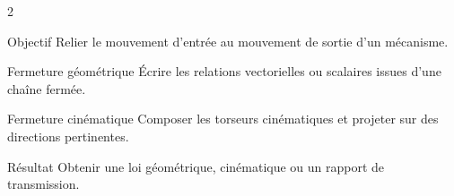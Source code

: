\documentclass[a3paper,landscape,10pt]{article}
\begin{document}
\begin{multicols}{2}
\begin{TLPosterBloc}{Objectif}
Relier le mouvement d'entrée au mouvement de sortie d'un mécanisme.
\end{TLPosterBloc}

\begin{TLPosterBloc}{Fermeture géométrique}
Écrire les relations vectorielles ou scalaires issues d'une chaîne fermée.
\end{TLPosterBloc}

\begin{TLPosterBloc}{Fermeture cinématique}
Composer les torseurs cinématiques et projeter sur des directions pertinentes.
\end{TLPosterBloc}

\begin{TLPosterBloc}{Résultat}
Obtenir une loi géométrique, cinématique ou un rapport de transmission.
\end{TLPosterBloc}
\end{multicols}
\end{document}
